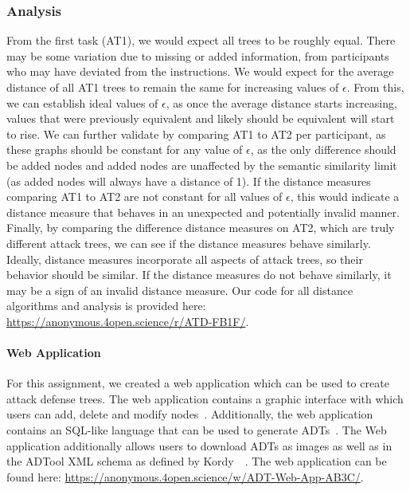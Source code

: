 \subsubsection{Analysis}
\label{ssec:method-analysis}
From the first task (AT1), we would expect all trees to be roughly equal. There may be some variation due to missing or added information, from participants who may have deviated from the instructions. We would expect for the average distance of all AT1 trees to remain the same for increasing values of $\epsilon$. From this, we can establish ideal values of $\epsilon$, as once the average distance starts increasing, values that were previously equivalent and likely should be equivalent will start to rise. We can further validate by comparing AT1 to AT2 per participant, as these graphs should be constant for any value of $\epsilon$, as the only difference should be added nodes and added nodes are unaffected by the semantic similarity limit (as added nodes will always have a distance of 1). If the distance measures comparing AT1 to AT2 are not constant for all values of $\epsilon$, this would indicate a distance measure that behaves in an unexpected and potentially invalid manner. Finally, by comparing the difference distance measures on AT2, which are truly different attack trees, we can see if the distance measures behave similarly. Ideally, distance measures incorporate all aspects of attack trees, so their behavior should be similar. If the distance measures do not behave similarly, it may be a sign of an invalid distance measure. Our code for all distance algorithms and analysis is provided here: \url{https://anonymous.4open.science/r/ATD-FB1F/}.

\paragraph{Web Application}

For this assignment, we created a web application which can be used to create attack defense trees. The web application contains a graphic interface with which users can add, delete and modify nodes~\cite{mohalaiaImplementingUserInterface2023}. Additionally, the web application contains an SQL-like language that can be used to generate ADTs~\cite{mezaADTLangDeclarativeLanguage2023}. The Web application additionally allows users to download ADTs as images as well as in the ADTool XML schema as defined by Kordy~\etal~\cite{kordy_adtool_2013}. The web application can be found here: \url{https://anonymous.4open.science/w/ADT-Web-App-AB3C/}.

